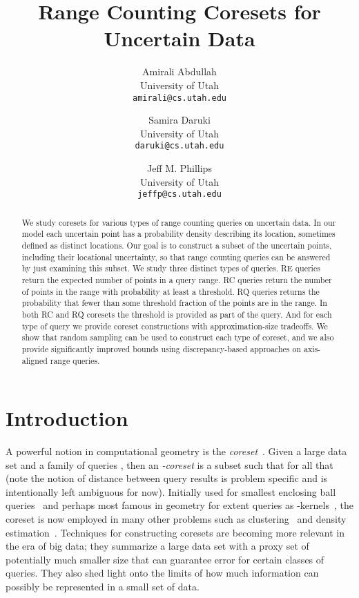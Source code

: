 \documentclass[11pt]{myclass}
\title{Range Counting Coresets for Uncertain Data}
\author{Amirali Abdullah \\ {\small University of Utah} \\ {\small \texttt{amirali@cs.utah.edu}}
\and 
Samira Daruki \\ {\small University of Utah} \\ {\small \texttt{daruki@cs.utah.edu}}
\and 
Jeff M. Phillips \\ {\small University of Utah} \\ {\small \texttt{jeffp@cs.utah.edu}}}
\newcommand{\RC}{\textsf{RC}\xspace}
\newcommand{\RE}{\textsf{RE}\xspace}
\newcommand{\RQ}{\textsf{RQ}\xspace}
\begin{document}
\maketitle

\begin{abstract}
We study coresets for various types of range counting queries on uncertain data.  In our model each uncertain point has a probability density describing its location, sometimes defined as  distinct locations.  Our goal is to construct a subset of the uncertain points, including their locational uncertainty, so that range counting queries can be answered by just examining this subset.  
We study three distinct types of queries.
\RE queries return the expected number of points in a query range.  
\RC queries return the number of points in the range with probability at least a threshold.
\RQ queries returns the probability that fewer than some threshold fraction of the points are in the range.
In both \RC and \RQ coresets the threshold is provided as part of the query.  
And for each type of query we provide coreset constructions with approximation-size tradeoffs.  
We show that random sampling can be used to construct each type of coreset, and we also provide significantly improved bounds using discrepancy-based approaches on axis-aligned range queries.  
\end{abstract}


\section{Introduction}
A powerful notion in computational geometry is the \emph{coreset}~\cite{AHV04,AHV07,BC03,VC71}.  Given a large data set  and a family of queries , then an \emph{-coreset} is a subset  such that for all  that  (note the notion of distance  between query results is problem specific and is intentionally left ambiguous for now).  Initially used for smallest enclosing ball queries~\cite{BC03} and perhaps most famous in geometry for extent queries as -kernels~\cite{AHV04,AHV07}, the coreset is now employed in many other problems such as clustering~\cite{BHP02} and density estimation~\cite{VC71}.  
Techniques for constructing coresets are becoming more relevant in the era of big data; they summarize a large data set  with a proxy set  of potentially much smaller size that can guarantee error for certain classes of queries.  They also shed light onto the limits of how much information can possibly be represented in a small set of data.  
\end{document}
